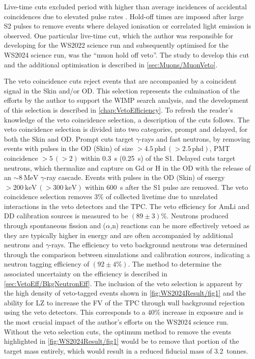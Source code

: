Live-time cuts excluded period with higher than average incidences of accidental coincidences due to elevated pulse rates \cite{LZCollaboration:2024lux}. Hold-off times are imposed after large S2 pulses to remove events where delayed ionisation or correlated light emission is observed. One particular live-time cut, which the author was responsible for developing for the WS2022 science run \cite{LZ:2022lsv} and subsequently optimised for the WS2024 science run, was the ``muon hold off veto''. The study to develop this cut and the additional optimisation is described in \autoref{sec:Muons/MuonVeto}.

The veto coincidence cuts reject events that are accompanied by a coincident signal in the Skin and/or OD. This selection represents the culmination of the efforts by the author to support the WIMP search analysis, and the development of this selection is described in \autoref{chap:VetoEfficiency}. To refresh the reader's knowledge of the veto coincidence selection, a description of the cuts follows. 
The veto coincidence selection is divided into two categories, prompt and delayed, for both the Skin and OD. Prompt cuts target $\gamma$-rays and fast neutrons, by removing events with pulses in the OD (Skin) of size $>4.5\,\text{phd}\,(>2.5\,\text{phd})$, PMT coincidence $>5\,(>2)$ within 0.3~\textmu s (0.25~\textmu s) of the S1. Delayed cuts target neutrons, which thermalize and capture on Gd or H in the OD with the release of an $\sim8~\text{MeV}$ $\gamma$-ray cascade. Events with pulses in the OD (Skin) of energy $>200~\text{keV}\,(>300~\text{keV})$ within 600~\textmu s after the S1 pulse are removed. The veto coincidence selection removes $3\%$ of collected livetime due to unrelated interactions in the veto detectors and the TPC. The veto efficiency for AmLi and DD calibration sources is measured to be $(89\pm3)\%$. Neutrons produced through spontaneous fission and ($\alpha$,n) reactions can be more effectively vetoed as they are typically higher in energy and are often accompanied by additional neutrons and $\gamma$-rays. The efficiency to veto background neutrons was determined through the comparison between simulations and calibration sources, indicating a neutron tagging efficiency of  $(92\pm4\%)$. The method to determine the associated uncertainty on the efficiency is described in \autoref{sec:VetoEff/BkgNeutronEff}.
The inclusion of the veto selection is apparent by the high density of veto-tagged events shown in \autoref{fig:WS2024Result/fig1} and the ability for LZ to increase the FV of the TPC through wall background rejection using the veto detectors. This corresponds to a $40\%$ increase in exposure and is the most crucial impact of the author's efforts on the WS2024 science run. Without the veto selection cuts, the optimum method to remove the events highlighted in \autoref{fig:WS2024Result/fig1} would be to remove that portion of the target mass entirely, which would result in a reduced fiducial mass of 3.2~tonnes.

